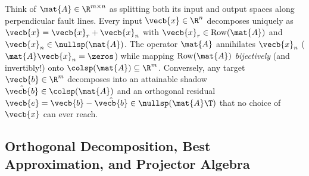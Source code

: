 \documentclass[../../../../master.tex]{subfiles}
\begin{document}
\begin{intuition}
Think of $\mat{A} \in \R^{m \times n}$ as splitting both its input and output spaces along perpendicular fault lines. Every input $\vecb{x} \in \R^n$ decomposes uniquely as $\vecb{x} = \vecb{x}_r + \vecb{x}_n$ with $\vecb{x}_r \in \mathrm{Row}(\mat{A})$ and $\vecb{x}_n \in \nullsp(\mat{A})$. The operator $\mat{A}$ annihilates $\vecb{x}_n$ ($\mat{A}\vecb{x}_n = \zeros$) while mapping $\mathrm{Row}(\mat{A})$ \emph{bijectively} (and invertibly!) onto $\colsp(\mat{A}) \subseteq \R^m$. Conversely, any target $\vecb{b} \in \R^m$ decomposes into an attainable shadow $\hat{\vecb{b}} \in \colsp(\mat{A})$ and an orthogonal residual $\vecb{e} = \vecb{b} - \hat{\vecb{b}} \in \nullsp(\mat{A}\T)$ that no choice of $\vecb{x}$ can ever reach.
\end{intuition}

\subsection{Orthogonal Decomposition, Best Approximation, and Projector Algebra}
\end{document}
